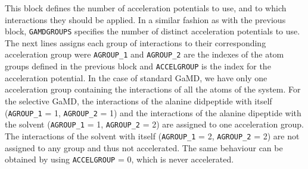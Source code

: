 This block defines the number of acceleration potentials to use, and to which interactions they should be applied.
In a similar fashion as with the previous block, \texttt{GAMDGROUPS} specifies the number of distinct acceleration potentials to use. 
The next lines assigns each group of interactions to their corresponding acceleration group were \texttt{AGROUP\_1} and \texttt{AGROUP\_2}  are the indexes of the atom groups defined in the previous block and \texttt{ACCELGROUP} is the index for the acceleration potential. 
In the case of standard GaMD, we have only one acceleration group containing the interactions of all the atoms of the system. For the selective GaMD, the interactions of the alanine didpeptide with itself (\texttt{AGROUP\_1} = 1, \texttt{AGROUP\_2} = 1) and the interactions of the alanine dipeptide with the solvent (\texttt{AGROUP\_1} = 1, \texttt{AGROUP\_2} = 2) are assigned to one acceleration group. The interactions of the solvent with itself (\texttt{AGROUP\_1} = 2, \texttt{AGROUP\_2} = 2) are not assigned to any group and thus not accelerated. The same behaviour can be obtained by using \texttt{ACCELGROUP} = 0, which is never accelerated.


